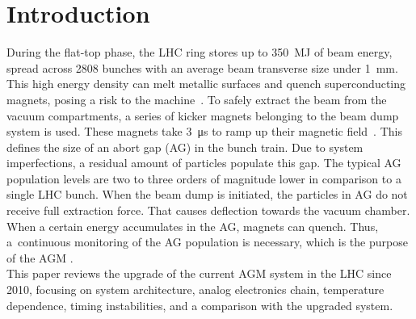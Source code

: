 \section{Introduction}
During the flat-top phase, the LHC ring stores up to \SI{350}{MJ} of beam energy,
spread across 2808 bunches with an average beam transverse size under
\SI{1}{mm}. This high energy density can melt metallic surfaces and quench
superconducting magnets, posing a risk to the machine~\cite{LHC_report}. 
To safely extract the beam from the vacuum compartments, a series of kicker
magnets belonging to the beam dump system is used. These magnets take \SI{3}{\micro\second} to
ramp up their magnetic field~\cite{beam_dump_system}. This defines the size of
an abort gap (AG) in the bunch train. Due to system imperfections, a residual amount of particles populate this gap.  The typical AG population levels are two to three orders of magnitude lower in comparison to a single LHC bunch.
When the beam dump is initiated, the particles in AG do not receive full
extraction force. That causes deflection towards the vacuum chamber. When a certain energy accumulates in the AG, magnets can quench. Thus,
a~continuous monitoring of the AG population is necessary, which is the purpose
of the AGM \cite{particles_in_ag}.\\
This paper reviews the upgrade of the current AGM system in the LHC since 2010,
focusing on system architecture, analog electronics chain, temperature
dependence, timing instabilities, and a comparison with the upgraded system.

